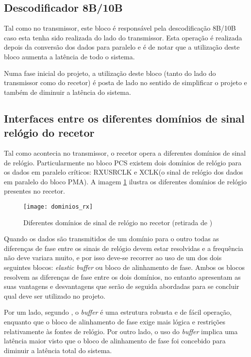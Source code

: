 \subsection{Descodificador 8B/10B}

Tal como no transmissor, este bloco é responsável pela descodificação 8B/10B caso esta tenha sido realizada do lado do transmissor. Esta operação é realizada depois da conversão dos dados para paralelo e é de notar que a utilização deste bloco aumenta a latência de todo o sistema.

Numa fase inicial do projeto, a utilização deste bloco (tanto do lado do transmissor como do recetor) é posta de lado no sentido de simplificar o projeto e também de diminuir a latência do sistema.   

\subsection{Interfaces entre os diferentes domínios de sinal relógio do recetor} \label{subsub:rx_buffer}

Tal como acontecia no transmissor, o recetor opera a diferentes domínios de sinal de relógio. Particularmente no bloco PCS existem dois domínios de relógio para os dados em paralelo críticos: RXUSRCLK e XCLK(o sinal de relógio dos dados em paralelo do bloco PMA). A imagem \ref{fig:dominios_rx} ilustra os diferentes domínios de relógio presentes no recetor.


\begin{figure}[h!]
	\begin{center}
		\leavevmode
		\texttt{[image: dominios\_rx]}
		\captionsetup{width=1.0\linewidth}
		\caption[Diferentes domínios de sinal de relógio no recetor]{Diferentes domínios de sinal de relógio no recetor (retirada de \cite{R011})}
		\label{fig:dominios_rx}
	\end{center}
\end{figure}

Quando os dados são transmitidos de um domínio para o outro todas as diferenças de fase entre os sinais de relógio devem estar resolvidas e a frequência não deve variara muito, e por isso deve-se recorrer ao uso de um dos dois seguintes blocos: \textit{elastic buffer} ou bloco de alinhamento de fase. Ambos os blocos resolvem as diferenças de fase entre os dois domínios, no entanto apresentam as suas vantagens e desvantagens que serão de seguida abordadas para se concluir qual deve ser utilizado no projeto.

Por um lado, segundo \cite{R011}, o \textit{buffer} é uma estrutura robusta e de fácil operação, enquanto que o bloco de alinhamento de fase exige mais lógica e restrições relativamente às fontes de relógio. Por outro lado, o uso do \textit{buffer} implica uma latência maior visto que o bloco de alinhamento de fase foi concebido para diminuir a latência total do sistema. 

